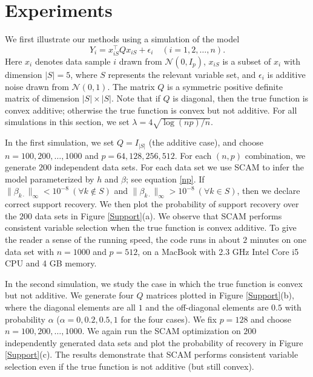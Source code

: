 \def\x{x}
\def\Q{Q}
\def\bds#1{#1}

\section{Experiments}
\label{sec:thesims}
We first illustrate our methods using a simulation of the model
\begin{equation}\nonumber
         Y_i = \x_{iS}^{\top}\Q\x_{iS} + \epsilon_i \quad (i=1,2,\ldots,n).
\end{equation}
Here $\x_{i}$ denotes data sample $i$ drawn from $\mathcal{N}(\bds{0},\bds{I}_{p})$, 
$\x_{iS}$ is a subset of $\x_i$ with dimension $|S|=5$, where $S$
represents the relevant variable set, and 
$\epsilon_i$ is additive noise drawn from $\mathcal{N}(0,1)$. 
The matrix $\Q$ is a symmetric positive definite matrix of dimension $|S|\times{}|S|$. 
Note that if $\Q$ is diagonal, then the true function is convex
additive; 
otherwise the true function is convex but not additive.
For all simulations in this section, we set $\lambda=4\sqrt{{\log(np)}/{n}}$.

In the first simulation, we set $\Q=\bds{I}_{|S|}$ (the additive
case), and choose $n=100, 200,\ldots,1000$ and $p=64,128,256,512$.
For each $(n,p)$ combination, we generate $200$ independent data
sets. For each data set we use SCAM to infer the model parameterized
by $\bds{h}$ and $\bds{\beta}$; see equation \eqref{np}. If
$\|\bds{\beta}_{k\cdot}\|_{\infty}<10^{-8}\ (\forall k\not\in{}S)$ and
$\|\bds{\beta}_{k\cdot}\|_{\infty}>10^{-8}\ (\forall k\in{}S)$, then
we declare correct support recovery. We then plot the probability of
support recovery over the $200$ data sets in Figure \ref{Support}(a).  We
observe that SCAM performs consistent variable selection when the true
function is convex additive.  
To give the reader a
sense of the running speed, the code runs in about $2$ minutes on one
data set with $n=1000$ and $p=512$, on a MacBook with 2.3 GHz Intel
Core i5 CPU and 4 GB memory.

In the second simulation, we study the case in which the true function
is convex but not additive. We generate four $\Q$ matrices
plotted in Figure \ref{Support}(b), where the diagonal elements are all $1$ and
the off-diagonal elements are $0.5$ with probability $\alpha$
($\alpha=0,0.2,0.5,1$ for the four cases). We fix $p=128$ and choose
$n=100,200,\ldots,1000$. We again run the SCAM optimization on $200$
independently generated data sets and plot the probability of recovery
in Figure \ref{Support}(c). The results demonstrate that SCAM performs
consistent variable selection even if the true function is not additive (but
still convex).

